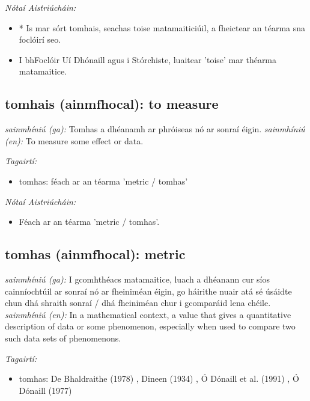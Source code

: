 \documentclass{article}
\begin{document}
 \noindent \textit{Nótaí Aistriúcháin:}
\begin{itemize}
	\item * Is mar sórt tomhais, seachas toise matamaiticiúil, a fheictear an téarma sna foclóirí seo.
	\item I bhFoclóir Uí Dhónaill agus i Stórchiste, luaitear 'toise' mar théarma matamaitice.
\end{itemize}


\subsection*{tomhais (ainmfhocal): to measure} 
 \noindent \textit{sainmhíniú (ga):} Tomhas a dhéanamh ar phróiseas nó ar sonraí éigin.
\newline\newline
 \noindent \textit{sainmhíniú (en):} To measure some effect or data.
\newline

 \noindent \textit{Tagairtí:}
\begin{itemize}
	\item tomhas: féach ar an téarma 'metric / tomhas'
\end{itemize}

 \noindent \textit{Nótaí Aistriúcháin:}
\begin{itemize}
	\item Féach ar an téarma 'metric / tomhas'.
\end{itemize}


\subsection*{tomhas (ainmfhocal): metric} 
 \noindent \textit{sainmhíniú (ga):} I gcomhthéacs matamaitice, luach a dhéanann cur síos cainníochtúil ar sonraí nó ar fheiniméan éigin, go háirithe nuair atá sé úsáidte chun dhá shraith sonraí / dhá fheiniméan chur i gcomparáid lena chéile.
\newline\newline
 \noindent \textit{sainmhíniú (en):} In a mathematical context, a value that gives a quantitative description of data or some phenomenon, especially when used to compare two such data sets of phenomenons.
\newline

 \noindent \textit{Tagairtí:}
\begin{itemize}
	\item tomhas: De Bhaldraithe (1978) \cite{de-bhaldraithe}, Dineen (1934) \cite{dineen}, Ó Dónaill et al. (1991) \cite{focloir-beag}, Ó Dónaill (1977) \cite{odonaill}
\end{itemize}
\end{document}
